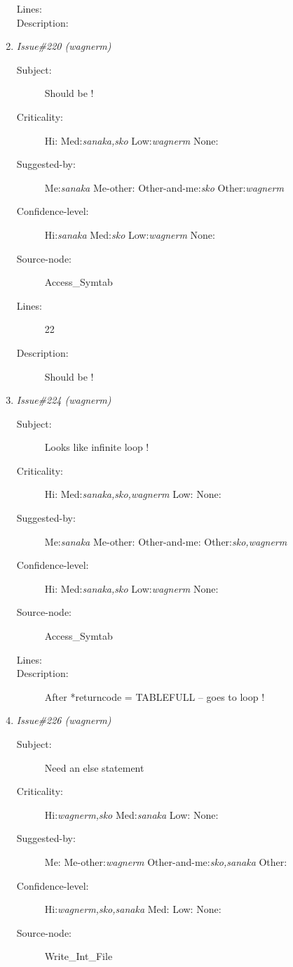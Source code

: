 \begin{enumerate}
\begin{description}
\item [Lines:] 

\item [Description:] 
\end{description}
\item {\it Issue\#220 (wagnerm)}
\begin{description}
\item [Subject:] Should be !
\item [Criticality:] Hi:{\it } Med:{\it sanaka,sko} Low:{\it wagnerm} None:{\it }
\item [Suggested-by:] Me:{\it sanaka} Me-other:{\it } Other-and-me:{\it sko} Other:{\it wagnerm}
\item [Confidence-level:] Hi:{\it sanaka} Med:{\it sko} Low:{\it wagnerm} None:{\it }
\item [Source-node:] Access\_Symtab

\item [Lines:] 22

\item [Description:] Should be !
\end{description}
\item {\it Issue\#224 (wagnerm)}
\begin{description}
\item [Subject:] Looks like infinite loop !
\item [Criticality:] Hi:{\it } Med:{\it sanaka,sko,wagnerm} Low:{\it } None:{\it }
\item [Suggested-by:] Me:{\it sanaka} Me-other:{\it } Other-and-me:{\it } Other:{\it sko,wagnerm}
\item [Confidence-level:] Hi:{\it } Med:{\it sanaka,sko} Low:{\it wagnerm} None:{\it }
\item [Source-node:] Access\_Symtab

\item [Lines:] 

\item [Description:] After *returncode = TABLEFULL -- goes to loop !
\end{description}
\item {\it Issue\#226 (wagnerm)}
\begin{description}
\item [Subject:] Need an else statement
\item [Criticality:] Hi:{\it wagnerm,sko} Med:{\it sanaka} Low:{\it } None:{\it }
\item [Suggested-by:] Me:{\it } Me-other:{\it wagnerm} Other-and-me:{\it sko,sanaka} Other:{\it }
\item [Confidence-level:] Hi:{\it wagnerm,sko,sanaka} Med:{\it } Low:{\it } None:{\it }
\item [Source-node:] Write\_Int\_File


\end{description}
\end{enumerate}
